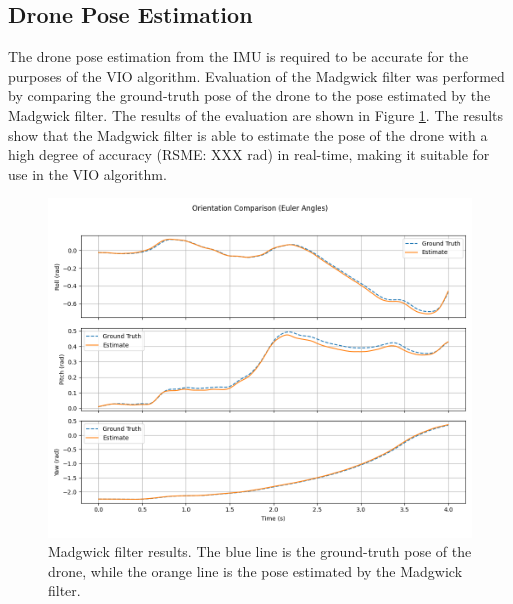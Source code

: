 \documentclass[bare_jrnl_transmag]{subfiles}
\begin{document}
\subsection{Drone Pose Estimation}
The drone pose estimation from the IMU is required to be accurate for the purposes of the VIO algorithm. Evaluation of the Madgwick filter was performed by comparing the ground-truth pose of the drone to the pose estimated by the Madgwick filter. The results of the evaluation are shown in Figure \ref{fig:madgwick_results}. The results show that the Madgwick filter is able to estimate the pose of the drone with a high degree of accuracy (RSME: XXX rad) in real-time, making it suitable for use in the VIO algorithm.

\begin{figure}[H]
    \centering
    \includegraphics[width=0.8\linewidth]{figures/madgwick_results.png}
    \caption{Madgwick filter results. The blue line is the ground-truth pose of the drone, while the orange line is the pose estimated by the Madgwick filter.}
    \label{fig:madgwick_results}
\end{figure}
\end{document}
